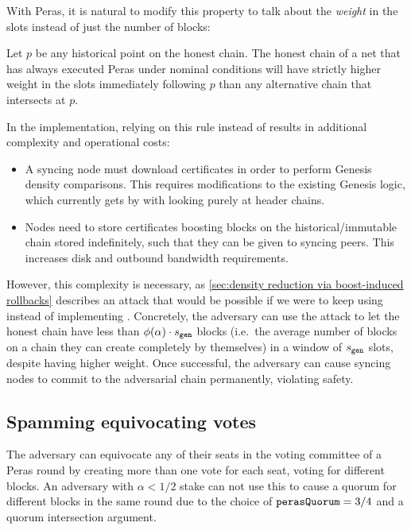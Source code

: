 \medskip
With Peras, it is natural to modify this property to talk about the \emph{weight} in the \sgen{} slots instead of just the number of blocks:
\begin{tcolorbox}[title=\weightedDensityOfCompetingChainsName]\label{property:weighted-density-of-competing-chains}
  Let $p$ be any historical point on the honest chain. The honest chain of a net that has always executed Peras under nominal conditions will have strictly higher weight in the \sgen{} slots immediately following $p$ than any alternative chain that intersects at $p$.
\end{tcolorbox}
In the implementation, relying on this rule instead of \densityOfCompetingChains{} results in additional complexity and operational costs:
\begin{itemize}
\item A syncing node must download certificates in order to perform Genesis density comparisons.
  This requires modifications to the existing Genesis logic, which currently gets by with looking purely at header chains.
\item Nodes need to store certificates boosting blocks on the historical/immutable chain stored indefinitely, such that they can be given to syncing peers.
  This increases disk and outbound bandwidth requirements.
\end{itemize}
However, this complexity is necessary, as \cref{sec:density reduction via boost-induced rollbacks} describes an attack that would be possible if we were to keep using \densityOfCompetingChains{} instead of implementing \weightedDensityOfCompetingChains{}.
Concretely, the adversary can use the attack to let the honest chain have less than $\phi(\alpha) \cdot s_{\mathtt{gen}}$ blocks (i.e.\ the average number of blocks on a chain they can create completely by themselves) in a window of $s_{\mathtt{gen}}$ slots, despite having higher weight.
Once successful, the adversary can cause syncing nodes to commit to the adversarial chain permanently, violating safety.

\subsection{Spamming equivocating votes}\label{sec:attack equivocations}

The adversary can equivocate any of their seats in the voting committee of a Peras round by creating more than one vote for each seat, voting for different blocks.
An adversary with $\alpha<1/2$ stake can not use this to cause a quorum for different blocks in the same round due to the choice of $\mathtt{perasQuorum} = 3/4$ and a quorum intersection argument.

